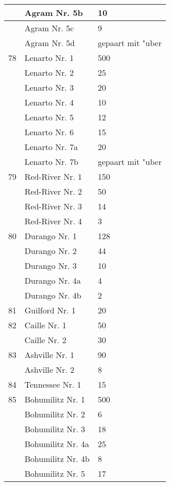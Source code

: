 \documentclass[a4paper, 11pt, oneside, polutonikogreek, german]{article}
\begin{document}
\begin{center}
\begin{longtable}{|l|l|l|}
          & Agram Nr. 5b & 10 \\ \hline
          & Agram Nr. 5c & 9 \\ \hline
          & Agram Nr. 5d & gepaart mit "uber \\ \hline
        78 & Lenarto Nr. 1 & 500 \\ \hline
          & Lenarto Nr. 2 & 25 \\ \hline
          & Lenarto Nr. 3 & 20 \\ \hline
          & Lenarto Nr. 4 & 10 \\ \hline
          & Lenarto Nr. 5 & 12 \\ \hline
          & Lenarto Nr. 6 & 15 \\ \hline
          & Lenarto Nr. 7a & 20 \\ \hline
          & Lenarto Nr. 7b & gepaart mit "uber \\ \hline
        79 & Red-River Nr. 1 & 150 \\ \hline
          & Red-River Nr. 2 & 50 \\ \hline
          & Red-River Nr. 3 & 14 \\ \hline
          & Red-River Nr. 4 & 3 \\ \hline
        80 & Durango Nr. 1 & 128 \\ \hline
          & Durango Nr. 2 & 44 \\ \hline
          & Durango Nr. 3 & 10 \\ \hline
          & Durango Nr. 4a & 4 \\ \hline
          & Durango Nr. 4b & 2 \\ \hline
        81 & Guilford Nr. 1 & 20 \\ \hline
        82 & Caille Nr. 1 & 50 \\ \hline
          & Caille Nr. 2 & 30 \\ \hline
        83 & Ashville Nr. 1 & 90 \\ \hline
          & Ashville Nr. 2 & 8 \\ \hline
        84 & Tennessee Nr. 1 & 15 \\ \hline
        85 & Bohumilitz Nr. 1 & 500 \\ \hline
          & Bohumilitz Nr. 2 & 6 \\ \hline
          & Bohumilitz Nr. 3 & 18 \\ \hline
          & Bohumilitz Nr. 4a & 25 \\ \hline
          & Bohumilitz Nr. 4b & 8 \\ \hline
          & Bohumilitz Nr. 5 & 17 \\ \hline

\end{longtable}
\end{center}
\end{document}
